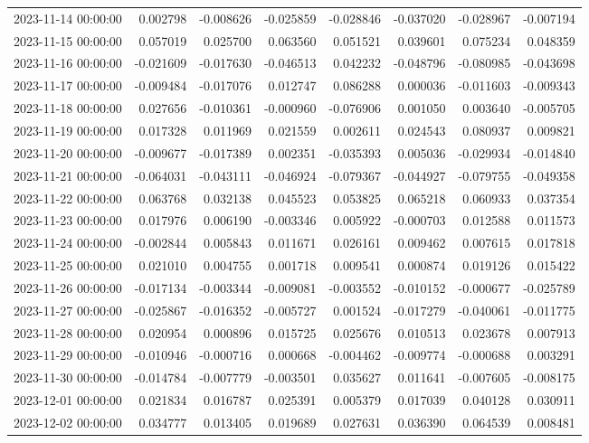 \begin{tabular}{lrrrrrrr}
2023-11-14 00:00:00 & 0.002798 & -0.008626 & -0.025859 & -0.028846 & -0.037020 & -0.028967 & -0.007194 \\
2023-11-15 00:00:00 & 0.057019 & 0.025700 & 0.063560 & 0.051521 & 0.039601 & 0.075234 & 0.048359 \\
2023-11-16 00:00:00 & -0.021609 & -0.017630 & -0.046513 & 0.042232 & -0.048796 & -0.080985 & -0.043698 \\
2023-11-17 00:00:00 & -0.009484 & -0.017076 & 0.012747 & 0.086288 & 0.000036 & -0.011603 & -0.009343 \\
2023-11-18 00:00:00 & 0.027656 & -0.010361 & -0.000960 & -0.076906 & 0.001050 & 0.003640 & -0.005705 \\
2023-11-19 00:00:00 & 0.017328 & 0.011969 & 0.021559 & 0.002611 & 0.024543 & 0.080937 & 0.009821 \\
2023-11-20 00:00:00 & -0.009677 & -0.017389 & 0.002351 & -0.035393 & 0.005036 & -0.029934 & -0.014840 \\
2023-11-21 00:00:00 & -0.064031 & -0.043111 & -0.046924 & -0.079367 & -0.044927 & -0.079755 & -0.049358 \\
2023-11-22 00:00:00 & 0.063768 & 0.032138 & 0.045523 & 0.053825 & 0.065218 & 0.060933 & 0.037354 \\
2023-11-23 00:00:00 & 0.017976 & 0.006190 & -0.003346 & 0.005922 & -0.000703 & 0.012588 & 0.011573 \\
2023-11-24 00:00:00 & -0.002844 & 0.005843 & 0.011671 & 0.026161 & 0.009462 & 0.007615 & 0.017818 \\
2023-11-25 00:00:00 & 0.021010 & 0.004755 & 0.001718 & 0.009541 & 0.000874 & 0.019126 & 0.015422 \\
2023-11-26 00:00:00 & -0.017134 & -0.003344 & -0.009081 & -0.003552 & -0.010152 & -0.000677 & -0.025789 \\
2023-11-27 00:00:00 & -0.025867 & -0.016352 & -0.005727 & 0.001524 & -0.017279 & -0.040061 & -0.011775 \\
2023-11-28 00:00:00 & 0.020954 & 0.000896 & 0.015725 & 0.025676 & 0.010513 & 0.023678 & 0.007913 \\
2023-11-29 00:00:00 & -0.010946 & -0.000716 & 0.000668 & -0.004462 & -0.009774 & -0.000688 & 0.003291 \\
2023-11-30 00:00:00 & -0.014784 & -0.007779 & -0.003501 & 0.035627 & 0.011641 & -0.007605 & -0.008175 \\
2023-12-01 00:00:00 & 0.021834 & 0.016787 & 0.025391 & 0.005379 & 0.017039 & 0.040128 & 0.030911 \\
2023-12-02 00:00:00 & 0.034777 & 0.013405 & 0.019689 & 0.027631 & 0.036390 & 0.064539 & 0.008481 \\

\end{tabular}
